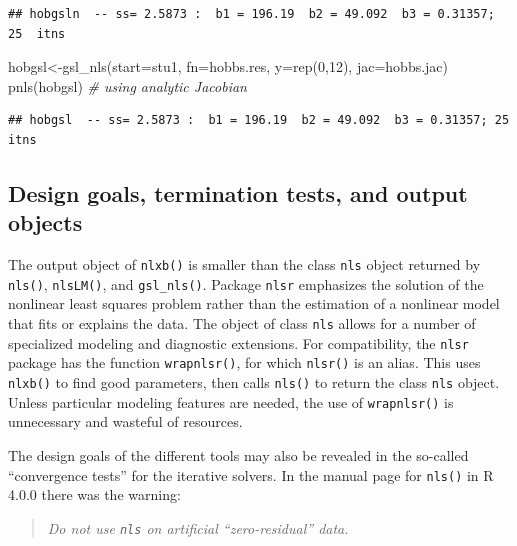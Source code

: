 \documentclass[
]{article}
\newenvironment{Shaded}{\begin{snugshade}}{\end{snugshade}}
\newcommand{\AttributeTok}[1]{\textcolor[rgb]{0.77,0.63,0.00}{#1}}
\newcommand{\CommentTok}[1]{\textcolor[rgb]{0.56,0.35,0.01}{\textit{#1}}}
\newcommand{\DecValTok}[1]{\textcolor[rgb]{0.00,0.00,0.81}{#1}}
\newcommand{\FunctionTok}[1]{\textcolor[rgb]{0.00,0.00,0.00}{#1}}
\newcommand{\NormalTok}[1]{#1}
\newcommand{\OtherTok}[1]{\textcolor[rgb]{0.56,0.35,0.01}{#1}}
\begin{document}
\begin{verbatim}
## hobgsln  -- ss= 2.5873 :  b1 = 196.19  b2 = 49.092  b3 = 0.31357; 25  itns
\end{verbatim}

\begin{Shaded}
\begin{Highlighting}[]
\NormalTok{hobgsl}\OtherTok{\textless{}{-}}\FunctionTok{gsl\_nls}\NormalTok{(}\AttributeTok{start=}\NormalTok{stu1, }\AttributeTok{fn=}\NormalTok{hobbs.res, }\AttributeTok{y=}\FunctionTok{rep}\NormalTok{(}\DecValTok{0}\NormalTok{,}\DecValTok{12}\NormalTok{), }\AttributeTok{jac=}\NormalTok{hobbs.jac)}
\FunctionTok{pnls}\NormalTok{(hobgsl) }\CommentTok{\# using analytic Jacobian}
\end{Highlighting}
\end{Shaded}

\begin{verbatim}
## hobgsl  -- ss= 2.5873 :  b1 = 196.19  b2 = 49.092  b3 = 0.31357; 25  itns
\end{verbatim}

\hypertarget{design-goals-termination-tests-and-output-objects}{%
\subsection{Design goals, termination tests, and output
objects}\label{design-goals-termination-tests-and-output-objects}}

The output object of \texttt{nlxb()} is smaller than the class
\texttt{nls} object returned by \texttt{nls()}, \texttt{nlsLM()}, and
\texttt{gsl\_nls()}. Package \texttt{nlsr} emphasizes the solution of
the nonlinear least squares problem rather than the estimation of a
nonlinear model that fits or explains the data. The object of class
\texttt{nls} allows for a number of specialized modeling and diagnostic
extensions. For compatibility, the \texttt{nlsr} package has the
function \texttt{wrapnlsr()}, for which \texttt{nlsr()} is an alias.
This uses \texttt{nlxb()} to find good parameters, then calls
\texttt{nls()} to return the class \texttt{nls} object. Unless
particular modeling features are needed, the use of \texttt{wrapnlsr()}
is unnecessary and wasteful of resources.

The design goals of the different tools may also be revealed in the
so-called ``convergence tests'' for the iterative solvers. In the manual
page for \texttt{nls()} in R 4.0.0 there was the warning:

\begin{quote}
\emph{Do not use \texttt{nls} on artificial ``zero-residual'' data.}
\end{quote}
\end{document}
